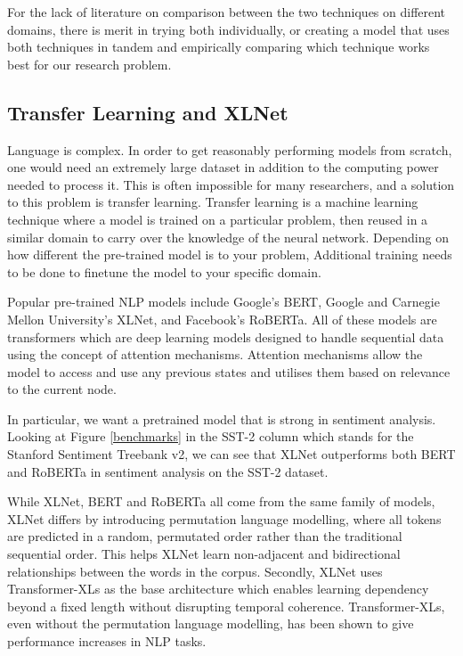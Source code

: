 \documentclass[12pt, a4paper]{article}
\begin{document}
For the lack of literature on comparison between the two techniques on different domains, there is merit in trying both individually, or creating a model that uses both techniques in tandem and empirically comparing which technique works best for our research problem.

\subsection{Transfer Learning and XLNet}
Language is complex. In order to get reasonably performing models from scratch, one would need an extremely large dataset in addition to the computing power needed to process it. This is often impossible for many researchers, and a solution to this problem is transfer learning. Transfer learning is a machine learning technique where a model is trained on a particular problem, then reused in a similar domain to carry over the knowledge of the neural network. Depending on how different the pre-trained model is to your problem, Additional training needs to be done to finetune the model to your specific domain. \cite{ruder2019transfer}

Popular pre-trained NLP models include Google's BERT, Google and Carnegie Mellon University's XLNet, and Facebook's RoBERTa. All of these models are transformers which are deep learning models designed to handle sequential data using the concept of attention mechanisms. Attention mechanisms allow the model to access and use any previous states and utilises them based on relevance to the current node. \cite{vaswani2017attention} 

In particular, we want a pretrained model that is strong in sentiment analysis. Looking at Figure \ref{benchmarks} in the SST-2 column which stands for the Stanford Sentiment Treebank v2, we can see that XLNet \cite{yang2020xlnet} outperforms both BERT and RoBERTa in sentiment analysis on the SST-2 dataset.

While XLNet, BERT and RoBERTa all come from the same family of models, XLNet differs by introducing permutation language modelling, where all tokens are predicted in a random, permutated order rather than the traditional sequential order. This helps XLNet learn non-adjacent and bidirectional relationships between the words in the corpus. Secondly, XLNet uses Transformer-XLs as the base architecture which enables learning dependency beyond a fixed length without disrupting temporal coherence. \cite{dai2019transformerxl} Transformer-XLs, even without the permutation language modelling, has been shown to give performance increases in NLP tasks. 
\end{document}
